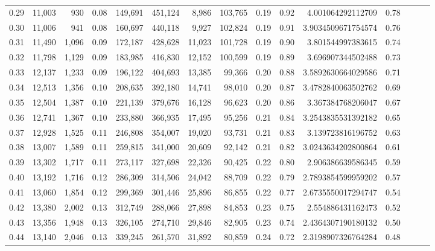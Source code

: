 \begin{tabular}{rrrrrrrrrrrrrrr}
0.29 &  11,003 &    930 &  0.08 &  149,691 &  451,124 &    8,986 &  103,765 &  0.19 &  0.92 &      4.001064292112709 &      0.78 \\
0.30 &  11,006 &    941 &  0.08 &  160,697 &  440,118 &    9,927 &  102,824 &  0.19 &  0.91 &     3.9034509671754574 &      0.76 \\
0.31 &  11,490 &  1,096 &  0.09 &  172,187 &  428,628 &   11,023 &  101,728 &  0.19 &  0.90 &      3.801544997383615 &      0.74 \\
0.32 &  11,798 &  1,129 &  0.09 &  183,985 &  416,830 &   12,152 &  100,599 &  0.19 &  0.89 &      3.696907344502488 &      0.73 \\
0.33 &  12,137 &  1,233 &  0.09 &  196,122 &  404,693 &   13,385 &   99,366 &  0.20 &  0.88 &     3.5892630664029586 &      0.71 \\
0.34 &  12,513 &  1,356 &  0.10 &  208,635 &  392,180 &   14,741 &   98,010 &  0.20 &  0.87 &     3.4782840063502762 &      0.69 \\
0.35 &  12,504 &  1,387 &  0.10 &  221,139 &  379,676 &   16,128 &   96,623 &  0.20 &  0.86 &      3.367384768206047 &      0.67 \\
0.36 &  12,741 &  1,367 &  0.10 &  233,880 &  366,935 &   17,495 &   95,256 &  0.21 &  0.84 &     3.2543835531392182 &      0.65 \\
0.37 &  12,928 &  1,525 &  0.11 &  246,808 &  354,007 &   19,020 &   93,731 &  0.21 &  0.83 &      3.139723816196752 &      0.63 \\
0.38 &  13,007 &  1,589 &  0.11 &  259,815 &  341,000 &   20,609 &   92,142 &  0.21 &  0.82 &     3.0243634202800864 &      0.61 \\
0.39 &  13,302 &  1,717 &  0.11 &  273,117 &  327,698 &   22,326 &   90,425 &  0.22 &  0.80 &      2.906386639586345 &      0.59 \\
0.40 &  13,192 &  1,716 &  0.12 &  286,309 &  314,506 &   24,042 &   88,709 &  0.22 &  0.79 &     2.7893854599959202 &      0.57 \\
0.41 &  13,060 &  1,854 &  0.12 &  299,369 &  301,446 &   25,896 &   86,855 &  0.22 &  0.77 &     2.6735550017294747 &      0.54 \\
0.42 &  13,380 &  2,002 &  0.13 &  312,749 &  288,066 &   27,898 &   84,853 &  0.23 &  0.75 &      2.554886431162473 &      0.52 \\
0.43 &  13,356 &  1,948 &  0.13 &  326,105 &  274,710 &   29,846 &   82,905 &  0.23 &  0.74 &     2.4364307190180132 &      0.50 \\
0.44 &  13,140 &  2,046 &  0.13 &  339,245 &  261,570 &   31,892 &   80,859 &  0.24 &  0.72 &     2.3198907326764284 &      0.48 \\

\end{tabular}
